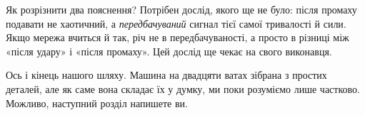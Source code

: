 Як розрізнити два пояснення? Потрібен дослід, якого ще не було: після промаху подавати не хаотичний, а \emph{передбачуваний} сигнал тієї самої тривалості й сили. Якщо мережа вчиться й так, річ не в передбачуваності, а просто в різниці між «після удару» і «після промаху». Цей дослід ще чекає на свого виконавця.

Ось і кінець нашого шляху. Машина на двадцяти ватах зібрана з простих деталей, але як саме вона складає їх у думку, ми поки розуміємо лише частково. Можливо, наступний розділ напишете ви.

